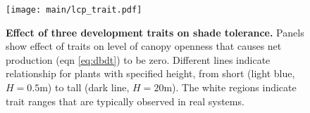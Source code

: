 \documentclass[a4paper,11pt]{article}
\begin{document}
\newpage

\begin{figure}[ht]
\centering
\texttt{[image: main/lcp\_trait.pdf]}
\caption{\textbf{Effect of three development traits on shade tolerance.}
Panels show effect of traits on level of canopy openness that causes net production (eqn \ref{eq:dbdt}) to be zero. Different lines indicate relationship for plants with specified height, from short (light blue,  $H=0.5$m) to tall (dark line, $H=20$m). The white regions indicate trait ranges that are typically observed in real systems.
\label{fig:wplcp}}
\end{figure}

\clearpage

\footnotesize


\end{document}
